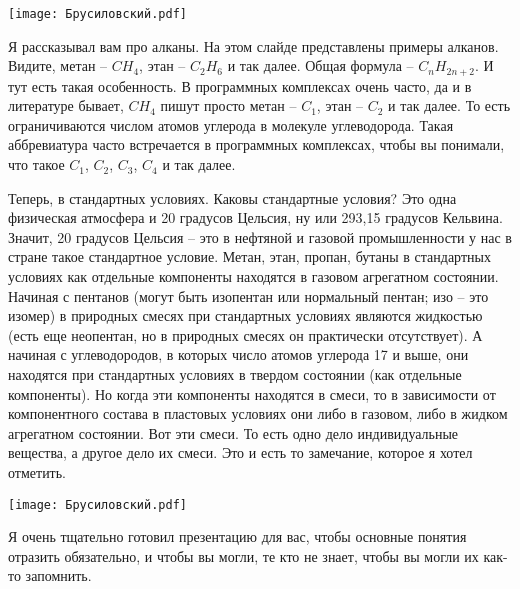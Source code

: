 \documentclass[main.tex]{subfiles}
\begin{document}
\begin{center}
\texttt{[image: Брусиловский.pdf]}
\end{center}

Я рассказывал вам про алканы.
На этом слайде представлены примеры алканов.
Видите, метан -- $CH_4$, этан -- $C_2H_6$ и так далее.
Общая формула -- $C_nH_{2n+2}$.
И тут есть такая особенность.
В программных комплексах очень часто, да и в литературе бывает, $CH_4$ пишут просто метан -- $C_1$, этан -- $C_2$ и так далее.
То есть ограничиваются числом атомов углерода в молекуле углеводорода.
Такая аббревиатура часто встречается в программных комплексах, чтобы вы понимали, что такое $C_1$, $C_2$, $C_3$, $C_4$ и так далее.

Теперь, в стандартных условиях. Каковы стандартные условия?
Это одна физическая атмосфера и 20 градусов Цельсия, ну или 293,15 градусов Кельвина.
Значит, 20 градусов Цельсия -- это в нефтяной и газовой промышленности у нас в стране такое стандартное условие.
Метан, этан, пропан, бутаны в стандартных условиях как отдельные компоненты находятся в газовом агрегатном состоянии.
Начиная с пентанов (могут быть изопентан или нормальный пентан; изо -- это изомер) в природных смесях при стандартных условиях являются жидкостью (есть еще неопентан, но в природных смесях он практически отсутствует).
А начиная с углеводородов, в которых число атомов углерода 17 и выше, они находятся при стандартных условиях в твердом состоянии (как отдельные компоненты).
Но когда эти компоненты находятся в смеси, то в зависимости от компонентного состава в пластовых условиях они либо в газовом, либо в жидком агрегатном состоянии.
Вот эти смеси.
То есть одно дело индивидуальные вещества, а другое дело их смеси.
Это и есть то замечание, которое я хотел отметить.

\begin{center}
\texttt{[image: Брусиловский.pdf]}
\end{center}

Я очень тщательно готовил презентацию для вас, чтобы основные понятия отразить обязательно, и чтобы вы могли, те кто не знает, чтобы вы могли их как-то запомнить.
\end{document}

